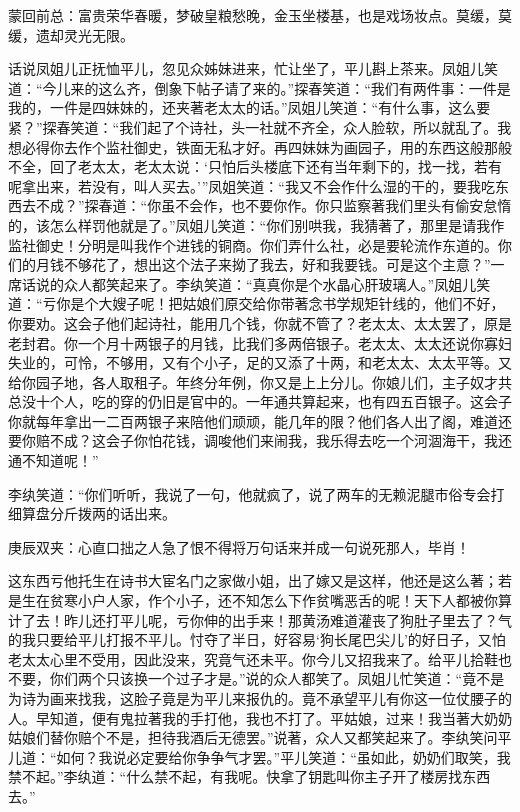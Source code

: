 

\begin{parag}
    \begin{note}蒙回前总：富贵荣华春暖，梦破皇粮愁晚，金玉坐楼基，也是戏场妆点。莫缓，莫缓，遗却灵光无限。\end{note}
\end{parag}


\begin{parag}
    话说凤姐儿正抚恤平儿，忽见众姊妹进来，忙让坐了，平儿斟上茶来。凤姐儿笑道：“今儿来的这么齐，倒象下帖子请了来的。”探春笑道：“我们有两件事：一件是我的，一件是四妹妹的，还夹著老太太的话。”凤姐儿笑道：“有什么事，这么要紧？”探春笑道：“我们起了个诗社，头一社就不齐全，众人脸软，所以就乱了。我想必得你去作个监社御史，铁面无私才好。再四妹妹为画园子，用的东西这般那般不全，回了老太太，老太太说：‘只怕后头楼底下还有当年剩下的，找一找，若有呢拿出来，若没有，叫人买去。’”凤姐笑道：“我又不会作什么湿的干的，要我吃东西去不成？”探春道：“你虽不会作，也不要你作。你只监察著我们里头有偷安怠惰的，该怎么样罚他就是了。”凤姐儿笑道：“你们别哄我，我猜著了，那里是请我作监社御史！分明是叫我作个进钱的铜商。你们弄什么社，必是要轮流作东道的。你们的月钱不够花了，想出这个法子来拗了我去，好和我要钱。可是这个主意？”一席话说的众人都笑起来了。李纨笑道：“真真你是个水晶心肝玻璃人。”凤姐儿笑道：“亏你是个大嫂子呢！把姑娘们原交给你带著念书学规矩针线的，他们不好，你要劝。这会子他们起诗社，能用几个钱，你就不管了？老太太、太太罢了，原是老封君。你一个月十两银子的月钱，比我们多两倍银子。老太太、太太还说你寡妇失业的，可怜，不够用，又有个小子，足的又添了十两，和老太太、太太平等。又给你园子地，各人取租子。年终分年例，你又是上上分儿。你娘儿们，主子奴才共总没十个人，吃的穿的仍旧是官中的。一年通共算起来，也有四五百银子。这会子你就每年拿出一二百两银子来陪他们顽顽，能几年的限？他们各人出了阁，难道还要你赔不成？这会子你怕花钱，调唆他们来闹我，我乐得去吃一个河涸海干，我还通不知道呢！”
\end{parag}


\begin{parag}
    李纨笑道：“你们听听，我说了一句，他就疯了，说了两车的无赖泥腿市俗专会打细算盘分斤拨两的话出来。\begin{note}庚辰双夹：心直口拙之人急了恨不得将万句话来并成一句说死那人，毕肖！\end{note}这东西亏他托生在诗书大宦名门之家做小姐，出了嫁又是这样，他还是这么著；若是生在贫寒小户人家，作个小子，还不知怎么下作贫嘴恶舌的呢！天下人都被你算计了去！昨儿还打平儿呢，亏你伸的出手来！那黄汤难道灌丧了狗肚子里去了？气的我只要给平儿打报不平儿。忖夺了半日，好容易‘狗长尾巴尖儿’的好日子，又怕老太太心里不受用，因此没来，究竟气还未平。你今儿又招我来了。给平儿拾鞋也不要，你们两个只该换一个过子才是。”说的众人都笑了。凤姐儿忙笑道：“竟不是为诗为画来找我，这脸子竟是为平儿来报仇的。竟不承望平儿有你这一位仗腰子的人。早知道，便有鬼拉著我的手打他，我也不打了。平姑娘，过来！我当著大奶奶姑娘们替你赔个不是，担待我酒后无德罢。”说著，众人又都笑起来了。李纨笑问平儿道：“如何？我说必定要给你争争气才罢。”平儿笑道：“虽如此，奶奶们取笑，我禁不起。”李纨道：“什么禁不起，有我呢。快拿了钥匙叫你主子开了楼房找东西去。”
\end{parag}


